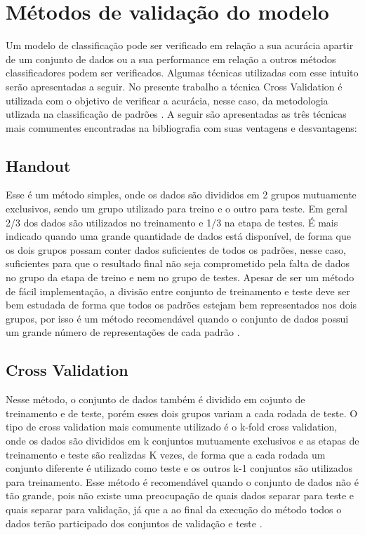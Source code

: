 \section{Métodos de validação do modelo}
Um modelo de classificação pode ser verificado em relação a sua acurácia apartir de um conjunto de dados ou a sua performance em relação a outros métodos classificadores podem ser verificados. Algumas técnicas utilizadas com esse intuito serão apresentadas a seguir. No presente trabalho a técnica Cross Validation é utilizada com o objetivo de verificar a acurácia, nesse caso, da metodologia utlizada na classificação de padrões \cite{Kohavi95Cross} \cite{Baldisserotto05Validacao}.
A seguir são apresentadas as três técnicas mais comumentes encontradas na bibliografia com suas ventagens e desvantagens:

\subsection{Handout}
Esse é um método simples, onde os dados são divididos em 2 grupos mutuamente exclusivos, sendo um grupo utilizado para treino e o outro para teste. Em geral 2/3 dos dados são utilizados no treinamento e 1/3 na etapa de testes. É mais indicado quando uma grande quantidade de dados está disponível, de forma que os dois grupos possam conter dados suficientes de todos os padrões, nesse caso, suficientes para que o resultado final não seja comprometido pela falta de dados no grupo da etapa de treino e nem no grupo de testes. Apesar de ser um método de fácil implementação, a divisão entre conjunto de treinamento e teste deve ser bem estudada de forma que todos os padrões estejam bem representados nos dois grupos, por isso é um método recomendável quando o conjunto de dados possui um grande número de representações de cada padrão \cite{Kohavi95Cross} \cite{Baldisserotto05Validacao}.

\subsection {Cross Validation}
Nesse método, o conjunto de dados também é dividido em cojunto de treinamento e de teste, porém esses dois grupos variam a cada rodada de teste. O tipo de cross validation mais comumente utilizado é o k-fold cross validation, onde os dados são divididos em k conjuntos mutuamente exclusivos e as etapas de treinamento e teste são realizdas K vezes, de forma que a cada rodada um conjunto diferente é utilizado como teste e os outros k-1 conjuntos são utilizados para treinamento. Esse método é recomendável quando o conjunto de dados não é tão grande, pois não existe uma  preocupação de quais dados separar para teste e quais separar para validação, já que a ao final da execução do método todos o dados terão participado dos conjuntos de validação e teste \cite{Kohavi95Cross} \cite{Baldisserotto05Validacao}.

